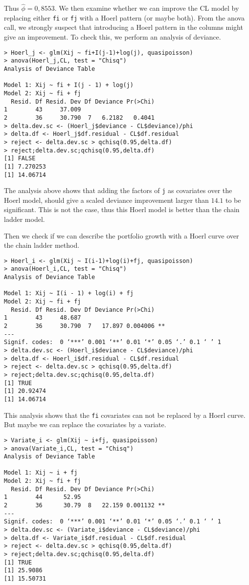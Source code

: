 \documentclass[11pt]{article}
\begin{document}
Thus $\hat{\phi} = 0,8553$. We then examine whether we can improve the CL model by replacing either \verb|fi| or \verb|fj| with a Hoerl pattern (or maybe both). From the anova call, we strongly suspect that introducing a Hoerl pattern in the columns might give an improvement. To check this, we perform an analysis of deviance.

\begin{verbatim}
> Hoerl_j <- glm(Xij ~ fi+I(j-1)+log(j), quasipoisson)
> anova(Hoerl_j,CL, test = "Chisq")
Analysis of Deviance Table

Model 1: Xij ~ fi + I(j - 1) + log(j)
Model 2: Xij ~ fi + fj
  Resid. Df Resid. Dev Df Deviance Pr(>Chi)
1        43     37.009                     
2        36     30.790  7   6.2182   0.4041
> delta.dev.sc <- (Hoerl_j$deviance - CL$deviance)/phi
> delta.df <- Hoerl_j$df.residual - CL$df.residual
> reject <- delta.dev.sc > qchisq(0.95,delta.df)
> reject;delta.dev.sc;qchisq(0.95,delta.df)
[1] FALSE
[1] 7.270253
[1] 14.06714
\end{verbatim}

The analysis above shows that adding the factors of \verb|j| as covariates over the Hoerl model, should give a scaled deviance improvement larger than $14.1$ to be significant. This is not the case, thus this Hoerl model is better than the chain ladder model.

Then we check if we can describe the portfolio growth with a Hoerl curve over the chain ladder method.

\begin{verbatim}
> Hoerl_i <- glm(Xij ~ I(i-1)+log(i)+fj, quasipoisson)
> anova(Hoerl_i,CL, test = "Chisq")
Analysis of Deviance Table

Model 1: Xij ~ I(i - 1) + log(i) + fj
Model 2: Xij ~ fi + fj
  Resid. Df Resid. Dev Df Deviance Pr(>Chi)   
1        43     48.687                        
2        36     30.790  7   17.897 0.004006 **
---
Signif. codes:  0 ‘***’ 0.001 ‘**’ 0.01 ‘*’ 0.05 ‘.’ 0.1 ‘ ’ 1
> delta.dev.sc <- (Hoerl_i$deviance - CL$deviance)/phi
> delta.df <- Hoerl_i$df.residual - CL$df.residual
> reject <- delta.dev.sc > qchisq(0.95,delta.df)
> reject;delta.dev.sc;qchisq(0.95,delta.df)
[1] TRUE
[1] 20.92474
[1] 14.06714
\end{verbatim}

This analysis shows that the \verb|fi| covariates can not be replaced by a Hoerl curve. But maybe we can replace the covariates by a variate.

\begin{verbatim}
> Variate_i <- glm(Xij ~ i+fj, quasipoisson)
> anova(Variate_i,CL, test = "Chisq")
Analysis of Deviance Table

Model 1: Xij ~ i + fj
Model 2: Xij ~ fi + fj
  Resid. Df Resid. Dev Df Deviance Pr(>Chi)   
1        44      52.95                        
2        36      30.79  8   22.159 0.001132 **
---
Signif. codes:  0 ‘***’ 0.001 ‘**’ 0.01 ‘*’ 0.05 ‘.’ 0.1 ‘ ’ 1
> delta.dev.sc <- (Variate_i$deviance - CL$deviance)/phi
> delta.df <- Variate_i$df.residual - CL$df.residual
> reject <- delta.dev.sc > qchisq(0.95,delta.df)
> reject;delta.dev.sc;qchisq(0.95,delta.df)
[1] TRUE
[1] 25.9086
[1] 15.50731
\end{verbatim}
\end{document}
